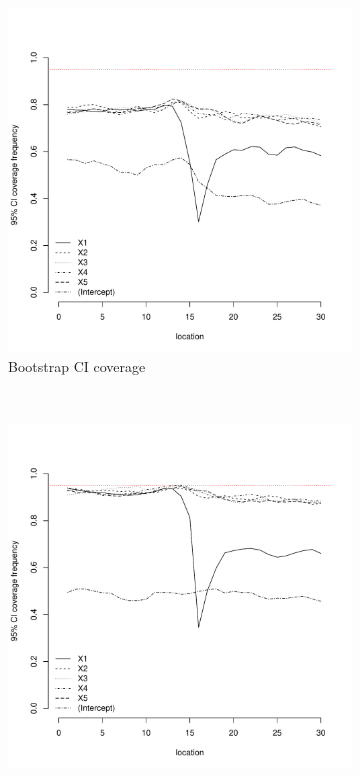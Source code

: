 \documentclass[authoryear, review, 11pt]{elsarticle}
\begin{document}
\begin{figure}
	\vspace{-30mm}
	\centering
	\begin{subfigure}[b]{0.45\textwidth}
	\centering
		\includegraphics[width=\textwidth]{../../figures/simulation/15.9.profile_bootstrap_coverage.pdf}
		\caption{Bootstrap CI coverage}
	\end{subfigure}%
	~ %
	\begin{subfigure}[b]{0.45\textwidth}
	\centering
		\includegraphics[width=\textwidth]{../../figures/simulation/15.9.profile_se_coverage.pdf}

\end{subfigure}
\end{figure}
\end{document}

